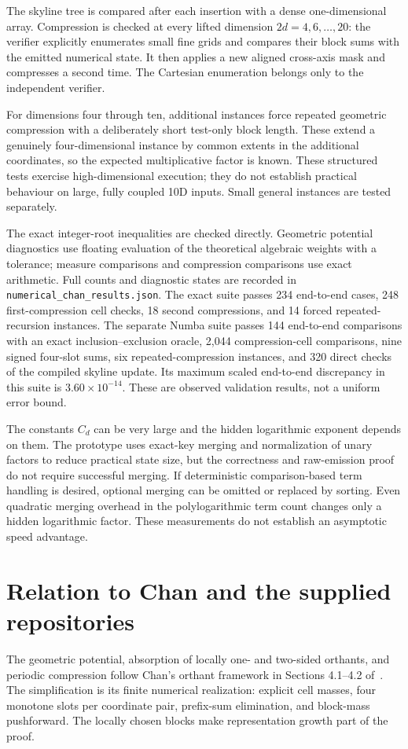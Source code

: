 \documentclass[12pt,a4paper]{article}
\newcommand{\1}{\mathbf1}
\begin{document}
The skyline tree is compared after each insertion with a dense
one-dimensional array. Compression is checked at every lifted dimension
$2d=4,6,\ldots,20$: the verifier explicitly enumerates small fine grids
and compares their block sums with the emitted numerical state. It then
applies a new aligned cross-axis mask and compresses a second time.
The Cartesian enumeration belongs only to the independent verifier.

For dimensions four through ten, additional instances force repeated
geometric compression with a deliberately short test-only block length.
These extend a genuinely four-dimensional instance by common extents in
the additional coordinates, so the expected multiplicative factor is
known. These structured tests exercise high-dimensional execution; they
do not establish practical behaviour on large, fully coupled 10D inputs.
Small general instances are tested separately.

The exact integer-root inequalities are checked directly. Geometric
potential diagnostics use floating evaluation of the theoretical
algebraic weights with a tolerance; measure comparisons and compression
comparisons use exact arithmetic. Full counts and diagnostic states are
recorded in \texttt{numerical\_chan\_results.json}.
The exact suite passes 234 end-to-end cases, 248 first-compression cell
checks, 18 second compressions, and 14 forced repeated-recursion instances.
The separate Numba suite passes 144 end-to-end comparisons with an exact
inclusion--exclusion oracle, 2,044 compression-cell comparisons,
nine signed four-slot sums, six repeated-compression instances, and
320 direct checks of the compiled skyline update. Its maximum scaled
end-to-end discrepancy in this suite is $3.60\times10^{-14}$.
These are observed validation results, not a uniform error bound.

The constants $C_d$ can be very large and the hidden logarithmic exponent
depends on them. The prototype uses exact-key merging and normalization
of unary factors to reduce practical state size, but the correctness and
raw-emission proof do not require successful merging. If deterministic
comparison-based term handling is desired, optional merging can be omitted
or replaced by sorting. Even quadratic merging overhead in the
polylogarithmic term count changes only a hidden logarithmic factor.
These measurements do not establish an asymptotic speed advantage.

\section{Relation to Chan and the supplied repositories}
The geometric potential, absorption of locally one- and two-sided
orthants, and periodic compression follow Chan's orthant framework
in Sections 4.1--4.2 of~\cite{chan}. The simplification is its finite
numerical realization: explicit cell masses, four monotone slots per
coordinate pair, prefix-sum elimination, and block-mass pushforward.
The locally chosen blocks make representation growth part of the proof.
\end{document}
